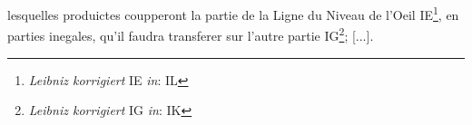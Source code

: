 \pend \pstart[p.~73] [...] lesquelles produictes coupperont la partie de la Ligne du Niveau de l'Oeil IE\footnote{\textit{Leibniz korrigiert} IE \textit{in}: IL}, en parties inegales, qu'il faudra transferer sur l'autre partie IG\footnote{\textit{Leibniz korrigiert} IG \textit{in}: IK}; [...].